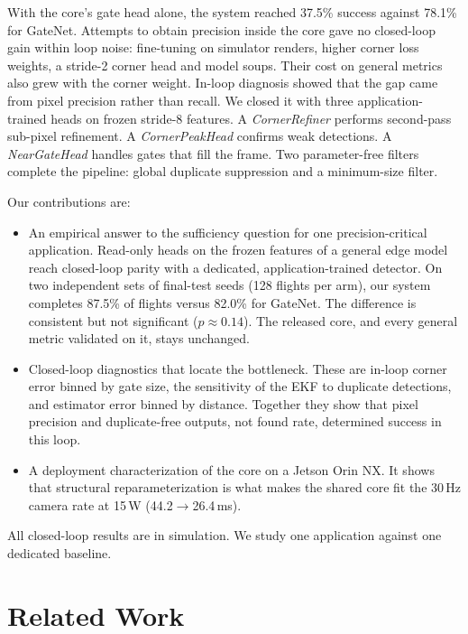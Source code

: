 \documentclass[10pt,twocolumn,letterpaper]{article}
\begin{document}
With the core's gate head alone, the system reached 37.5\% success against 78.1\% for GateNet. Attempts to obtain precision inside the core gave no closed-loop gain within loop noise: fine-tuning on simulator renders, higher corner loss weights, a stride-2 corner head and model soups. Their cost on general metrics also grew with the corner weight. In-loop diagnosis showed that the gap came from pixel precision rather than recall. We closed it with three application-trained heads on frozen stride-8 features. A \emph{CornerRefiner} performs second-pass sub-pixel refinement. A \emph{CornerPeakHead} confirms weak detections. A \emph{NearGateHead} handles gates that fill the frame. Two parameter-free filters complete the pipeline: global duplicate suppression and a minimum-size filter.

Our contributions are:
\begin{itemize}
    \item An empirical answer to the sufficiency question for one precision-critical application. Read-only heads on the frozen features of a general edge model reach closed-loop parity with a dedicated, application-trained detector. On two independent sets of final-test seeds (128 flights per arm), our system completes 87.5\% of flights versus 82.0\% for GateNet. The difference is consistent but not significant ($p\approx0.14$). The released core, and every general metric validated on it, stays unchanged.
    \item Closed-loop diagnostics that locate the bottleneck. These are in-loop corner error binned by gate size, the sensitivity of the EKF to duplicate detections, and estimator error binned by distance. Together they show that pixel precision and duplicate-free outputs, not found rate, determined success in this loop.
    \item A deployment characterization of the core on a Jetson Orin NX. It shows that structural reparameterization is what makes the shared core fit the 30\,Hz camera rate at 15\,W (44.2$\to$26.4\,ms).
\end{itemize}
All closed-loop results are in simulation. We study one application against one dedicated baseline.

\section{Related Work}
\label{sec:related_work}
\end{document}
